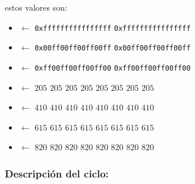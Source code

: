 estos valores son:
\begin{itemize}
  \item {}  $\leftarrow$ \texttt{0xffffffffffffffff} \texttt{0xffffffffffffffff}
  \item {} $\leftarrow$ \texttt{0x00ff00ff00ff00ff} \texttt{0x00ff00ff00ff00ff}
  \item {} $\leftarrow$ \texttt{0xff00ff00ff00ff00} \texttt{0xff00ff00ff00ff00}
  \item {} $\leftarrow$ $205$ $205$ $205$ $205$ $205$ $205$ $205$ $205$
  \item {} $\leftarrow$ $410$ $410$ $410$ $410$ $410$ $410$ $410$ $410$
  \item {} $\leftarrow$ $615$ $615$ $615$ $615$ $615$ $615$ $615$ $615$
  \item {} $\leftarrow$ $820$ $820$ $820$ $820$ $820$ $820$ $820$ $820$ 
\end{itemize}

\subsubsection{Descripción del ciclo:}

